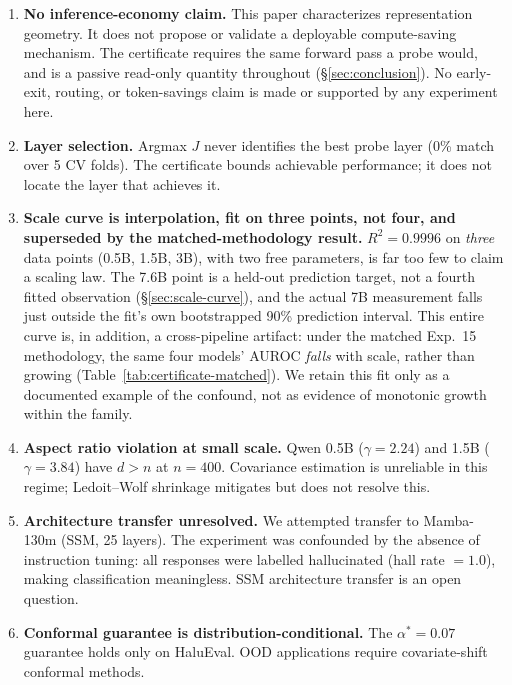 \documentclass[10pt,twocolumn]{article}
\begin{document}
\begin{enumerate}[leftmargin=*, topsep=2pt, itemsep=2pt]
\item \textbf{No inference-economy claim.} This paper characterizes
  representation geometry. It does not propose or validate a deployable
  compute-saving mechanism. The certificate requires the same forward
  pass a probe would, and is a passive read-only quantity throughout
  (\S\ref{sec:conclusion}). No early-exit, routing, or token-savings
  claim is made or supported by any experiment here.

\item \textbf{Layer selection.}  Argmax $J$ never identifies the best
  probe layer (0\% match over 5 CV folds).  The certificate bounds
  achievable performance; it does not locate the layer that achieves it.

\item \textbf{Scale curve is interpolation, fit on three points, not
  four, and superseded by the matched-methodology result.}
  $R^2 = 0.9996$ on \emph{three} data points (0.5B, 1.5B, 3B), with two
  free parameters, is far too few to claim a scaling law. The 7.6B
  point is a held-out prediction target, not a fourth fitted
  observation (\S\ref{sec:scale-curve}), and the actual 7B measurement
  falls just outside the fit's own bootstrapped 90\% prediction
  interval. This entire curve is, in addition, a cross-pipeline
  artifact: under the matched Exp.~15 methodology, the same four
  models' AUROC \emph{falls} with scale, rather than growing
  (Table~\ref{tab:certificate-matched}). We retain this fit only as a
  documented example of the confound, not as evidence of monotonic
  growth within the family.

\item \textbf{Aspect ratio violation at small scale.}  Qwen 0.5B
  ($\gamma = 2.24$) and 1.5B ($\gamma = 3.84$) have $d > n$ at $n = 400$.
  Covariance estimation is unreliable in this regime; Ledoit--Wolf
  shrinkage mitigates but does not resolve this.

\item \textbf{Architecture transfer unresolved.} We attempted transfer
  to Mamba-130m (SSM, 25 layers). The experiment was confounded by the
  absence of instruction tuning: all responses were labelled
  hallucinated (hall rate $= 1.0$), making classification meaningless.
  SSM architecture transfer is an open question.

\item \textbf{Conformal guarantee is distribution-conditional.}  The
  $\alpha^* = 0.07$ guarantee holds only on HaluEval.  OOD applications
  require covariate-shift conformal methods.


\end{enumerate}
\end{document}
